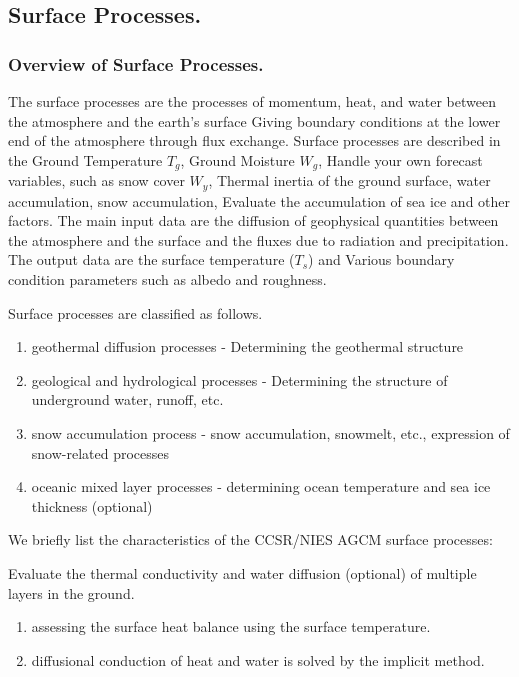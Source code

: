 \hypertarget{surface-processes.}{%
\subsection{Surface Processes.}\label{surface-processes.}}

\hypertarget{overview-of-surface-processes.}{%
\subsubsection{Overview of Surface
Processes.}\label{overview-of-surface-processes.}}

The surface processes are the processes of momentum, heat, and water
between the atmosphere and the earth's surface Giving boundary
conditions at the lower end of the atmosphere through flux exchange.
Surface processes are described in the Ground Temperature \(T_g\),
Ground Moisture \(W_g\), Handle your own forecast variables, such as
snow cover \(W_y\), Thermal inertia of the ground surface, water
accumulation, snow accumulation, Evaluate the accumulation of sea ice
and other factors. The main input data are the diffusion of geophysical
quantities between the atmosphere and the surface and the fluxes due to
radiation and precipitation. The output data are the surface temperature
(\(T_s\)) and Various boundary condition parameters such as albedo and
roughness.

Surface processes are classified as follows.

\begin{enumerate}
\def\labelenumi{\arabic{enumi}.}
\item
  geothermal diffusion processes - Determining the geothermal structure
\item
  geological and hydrological processes - Determining the structure of
  underground water, runoff, etc.
\item
  snow accumulation process - snow accumulation, snowmelt, etc.,
  expression of snow-related processes
\item
  oceanic mixed layer processes - determining ocean temperature and sea
  ice thickness (optional)
\end{enumerate}

We briefly list the characteristics of the CCSR/NIES AGCM surface
processes:

Evaluate the thermal conductivity and water diffusion (optional) of
multiple layers in the ground.

\begin{enumerate}
\def\labelenumi{\arabic{enumi}.}
\setcounter{enumi}{1}
\item
  assessing the surface heat balance using the surface temperature.
\item
  diffusional conduction of heat and water is solved by the implicit
  method.
\end{enumerate}

